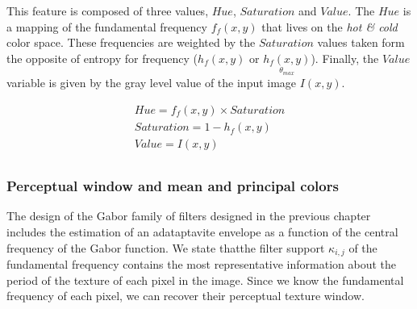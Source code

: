 This feature is composed of three values, $Hue$, $Saturation$ and $Value$. The $Hue$ is a mapping of the fundamental frequency $f_f(x,y)$ that lives on the \textit{hot \& cold} color space. These frequencies are weighted by the $Saturation$ values taken form the opposite of entropy for frequency ($h_{f}(x,y)$ or $\underset{\theta_{max}}{h_{f}(x,y)}$). Finally, the $Value$ variable is given by the gray level value of the input image $I(x,y)$.

\begin{gather}
    Hue = f_f(x,y) \times Saturation \\
    Saturation = 1 - h_{f} (x,y) \\
    Value = I(x,y) \\
\end{gather}

\subsubsection{Perceptual window and mean and principal colors}
The design of the Gabor family of filters designed in the previous chapter includes the estimation of an adataptavite envelope as a function of the central frequency of the Gabor function. We state thatthe filter support  $\kappa_{i,j}$ of the fundamental frequency contains the most representative information about the period of the texture of each pixel in the image. Since we know the fundamental frequency of each pixel, we can recover their perceptual texture window. 